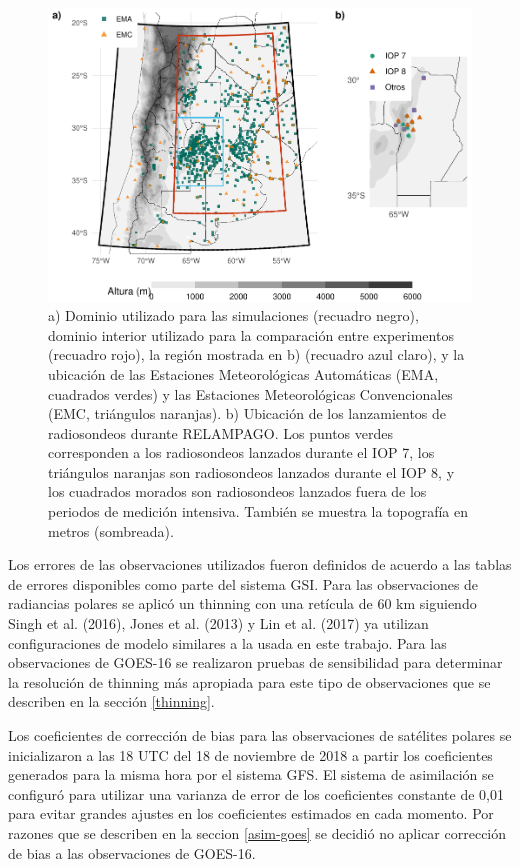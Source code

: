 \documentclass[12pt,oneside]{reedthesis}
\begin{document}
\begin{figure}

{\centering \includegraphics[width=0.8\linewidth]{thesis_files/figure-latex/dominio-1} 

}

\caption{a) Dominio utilizado para las simulaciones (recuadro negro), dominio interior utilizado para la comparación entre experimentos (recuadro rojo), la región mostrada en b) (recuadro azul claro), y la ubicación de las Estaciones Meteorológicas Automáticas (EMA, cuadrados verdes) y las Estaciones Meteorológicas Convencionales (EMC, triángulos naranjas). b) Ubicación de los lanzamientos de radiosondeos durante RELAMPAGO. Los puntos verdes corresponden a los radiosondeos lanzados durante el IOP 7, los triángulos naranjas son radiosondeos lanzados durante el IOP 8, y los cuadrados morados son radiosondeos lanzados fuera de los periodos de medición intensiva. También se muestra la topografía en metros (sombreada).}\label{fig:dominio}
\end{figure}
Los errores de las observaciones utilizados fueron definidos de acuerdo a las tablas de errores disponibles como parte del sistema GSI. Para las observaciones de radiancias polares se aplicó un thinning con una retícula de 60 km siguiendo Singh et al. (2016), Jones et al. (2013) y Lin et al. (2017) ya utilizan configuraciones de modelo similares a la usada en este trabajo. Para las observaciones de GOES-16 se realizaron pruebas de sensibilidad para determinar la resolución de thinning más apropiada para este tipo de observaciones que se describen en la sección \ref{thinning}.

Los coeficientes de corrección de bias para las observaciones de satélites polares se inicializaron a las 18 UTC del 18 de noviembre de 2018 a partir los coeficientes generados para la misma hora por el sistema GFS. El sistema de asimilación se configuró para utilizar una varianza de error de los coeficientes constante de 0,01 para evitar grandes ajustes en los coeficientes estimados en cada momento. Por razones que se describen en la seccion \ref{asim-goes} se decidió no aplicar corrección de bias a las observaciones de GOES-16.
\end{document}
